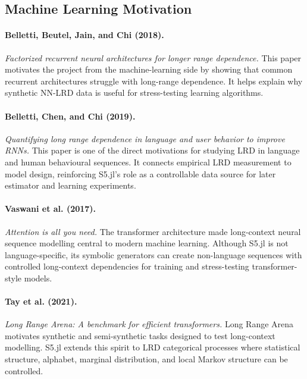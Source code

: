\subsection{Machine Learning Motivation}

\paragraph{Belletti, Beutel, Jain, and Chi (2018).}
\emph{Factorized recurrent neural architectures for longer range dependence.}
This paper motivates the project from the machine-learning side by showing that
common recurrent architectures struggle with long-range dependence. It helps
explain why synthetic NN-LRD data is useful for stress-testing learning
algorithms.

\paragraph{Belletti, Chen, and Chi (2019).}
\emph{Quantifying long range dependence in language and user behavior to improve
RNNs.}
This paper is one of the direct motivations for studying LRD in language and
human behavioural sequences. It connects empirical LRD measurement to model
design, reinforcing S5.jl's role as a controllable data source for later
estimator and learning experiments.

\paragraph{Vaswani et al. (2017).}
\emph{Attention is all you need.}
The transformer architecture made long-context neural sequence modelling central
to modern machine learning. Although S5.jl is not language-specific, its symbolic
generators can create non-language sequences with controlled long-context
dependencies for training and stress-testing transformer-style models.

\paragraph{Tay et al. (2021).}
\emph{Long Range Arena: A benchmark for efficient transformers.}
Long Range Arena motivates synthetic and semi-synthetic tasks designed to test
long-context modelling. S5.jl extends this spirit to LRD categorical processes
where statistical structure, alphabet, marginal distribution, and local Markov
structure can be controlled.
